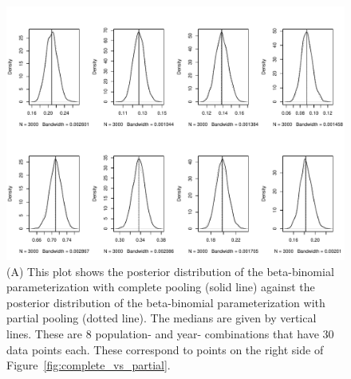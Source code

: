 \documentclass[12pt, oneside, titlepage]{article}   	%
\begin{document}
 \begin{figure}[h]
   \centering
       \includegraphics[page=1,width=.9\textwidth]{../../figures/appendix-x-match}  
    \caption{ (A) This plot shows the posterior distribution of the beta-binomial parameterization with complete pooling (solid line) against the posterior distribution of the beta-binomial parameterization with partial pooling (dotted line). The medians are given by vertical lines. These are 8 population- and year- combinations that have 30 data points each. These correspond to points on the right side of Figure~\ref{fig:complete_vs_partial}. }
 \label{fig:match}
\end{figure}
\end{document}
